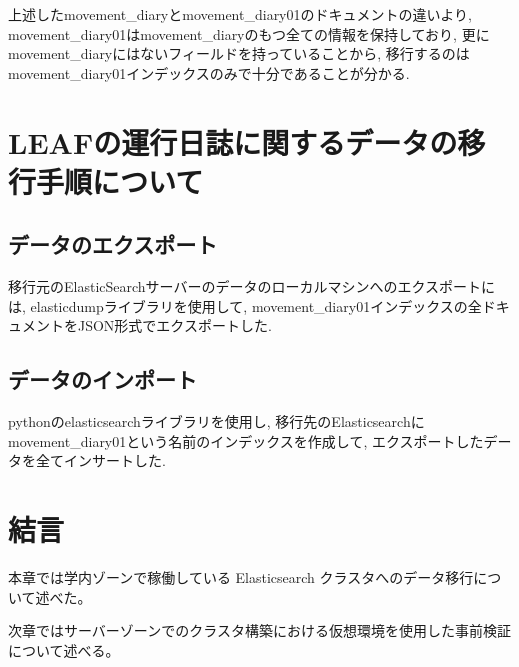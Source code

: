 上述したmovement\_diaryとmovement\_diary01のドキュメントの違いより, movement\_diary01はmovement\_diaryのもつ全ての情報を保持しており, 更にmovement\_diaryにはないフィールドを持っていることから, 移行するのはmovement\_diary01インデックスのみで十分であることが分かる.

\section{LEAFの運行日誌に関するデータの移行手順について}

\subsection{データのエクスポート}
移行元のElasticSearchサーバーのデータのローカルマシンへのエクスポートには, elasticdumpライブラリを使用して, movement\_diary01インデックスの全ドキュメントをJSON形式でエクスポートした.

\subsection{データのインポート}
pythonのelasticsearchライブラリを使用し, 移行先のElasticsearchにmovement\_diary01という名前のインデックスを作成して, エクスポートしたデータを全てインサートした.

\section{結言}
本章では学内ゾーンで稼働している Elasticsearch クラスタへのデータ移行について述べた。

次章ではサーバーゾーンでのクラスタ構築における仮想環境を使用した事前検証について述べる。